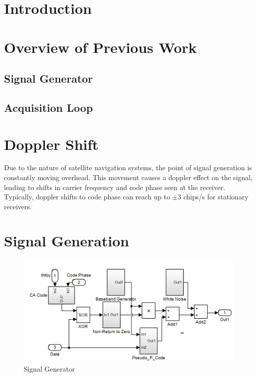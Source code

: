 \documentclass[11pt]{article}
\numberwithin{equation}{subsection}
\begin{document}
	\section{Introduction}
	\section{Overview of Previous Work}
	\subsection{Signal Generator}
	
	\subsection{Acquisition Loop}
	
	
	\section{Doppler Shift}
	
	Due to the nature of satellite navigation systems, the point of signal generation is constantly moving overhead. This movement causes a doppler effect on the signal, leading to shifts in carrier frequency and code phase seen at the receiver. Typically, doppler shifts to code phase can reach up to $\pm3$ chips/s for stationary receivers.
	\section{Signal Generation}
	
	\begin{figure}
		\centering
		
		\includegraphics[width=\textwidth]{Signal_Generator}
		\caption{Signal Generator}
		\label{signal_generator}
	\end{figure}	
	
\end{document}
